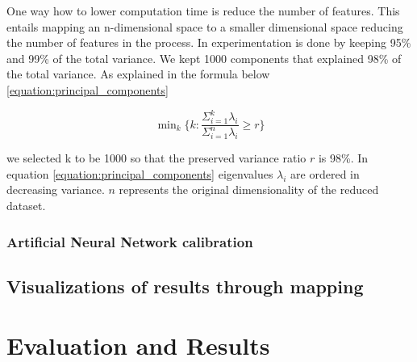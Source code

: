 \documentclass[12pt, a4paper]{report}
\theoremstyle{definition}
\theoremstyle{definition}%
\theoremstyle{definition}%
\theoremstyle{definition}%
\theoremstyle{definition}%
\theoremstyle{definition}%
\begin{document}
One way how to lower computation time is reduce the number of features. This entails mapping an n-dimensional space to a smaller dimensional space reducing the number of features in the process. In \cite{Yang2004} experimentation is done by keeping 95\% and 99\% of the total variance. We kept 1000 components that explained 98\% of the total variance. As explained in the formula below \ref{equation:principal_components}


\begin{equation} \label{equation:principal_components}
 \mathop{\text{min}}_k \Bigg\{ k : \frac{{\Sigma }_{i=1}^{k} \lambda_i}{{\Sigma }_{i=1}^{n}\lambda_i} \geq r \Bigg\}
\end{equation}

we selected k to be 1000 so that the preserved variance ratio $r$ is 98\%. In equation \ref{equation:principal_components} eigenvalues $\lambda_i$ are ordered in decreasing variance. $n$ represents the original dimensionality of the reduced dataset.

%


\subsection{Artificial Neural Network calibration}





\section{Visualizations of results through mapping}








\chapter{Evaluation and Results}
\end{document}
